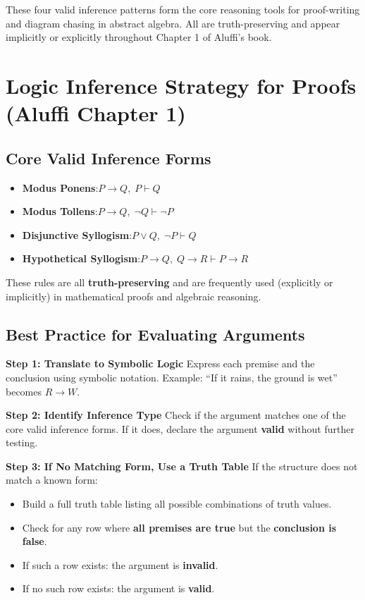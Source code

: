\documentclass[10pt]{article}
\theoremstyle{plain}
\theoremstyle{definition}
\begin{document}
  These four valid inference patterns form the core reasoning tools for proof-writing and diagram chasing in abstract algebra. All are truth-preserving and appear implicitly or explicitly throughout Chapter 1 of Aluffi’s book.
  
  \section*{Logic Inference Strategy for Proofs (Aluffi Chapter 1)}
  
  \subsection*{Core Valid Inference Forms}
  
  \begin{itemize}
  	\item \textbf{Modus Ponens}:\quad $P \rightarrow Q,\; P \vdash Q$
  	\item \textbf{Modus Tollens}:\quad $P \rightarrow Q,\; \lnot Q \vdash \lnot P$
  	\item \textbf{Disjunctive Syllogism}:\quad $P \lor Q,\; \lnot P \vdash Q$
  	\item \textbf{Hypothetical Syllogism}:\quad $P \rightarrow Q,\; Q \rightarrow R \vdash P \rightarrow R$
  \end{itemize}
  
  These rules are all \textbf{truth-preserving} and are frequently used (explicitly or implicitly) in mathematical proofs and algebraic reasoning.
  
  \subsection*{Best Practice for Evaluating Arguments}
  
  \textbf{Step 1: Translate to Symbolic Logic}  
  Express each premise and the conclusion using symbolic notation.  
  Example: “If it rains, the ground is wet” becomes $R \rightarrow W$.
  
  \textbf{Step 2: Identify Inference Type}  
  Check if the argument matches one of the core valid inference forms.  
  If it does, declare the argument \textbf{valid} without further testing.
  
  \textbf{Step 3: If No Matching Form, Use a Truth Table}  
  If the structure does not match a known form:
  \begin{itemize}
  	\item Build a full truth table listing all possible combinations of truth values.
  	\item Check for any row where \textbf{all premises are true} but the \textbf{conclusion is false}.
  	\item If such a row exists: the argument is \textbf{invalid}.
  	\item If no such row exists: the argument is \textbf{valid}.
  \end{itemize}
  
\end{document}
